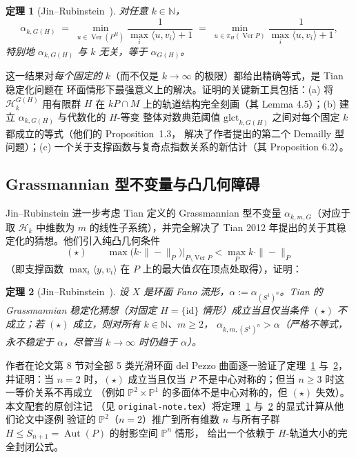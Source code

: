 \documentclass[11pt,a4paper]{article}
\newtheorem{theorem}{定理}[section]
\theoremstyle{definition}
\theoremstyle{remark}
\DeclareMathOperator{\Aut}{Aut}
\DeclareMathOperator{\Ver}{Ver}
\newcommand{\N}{\mathbb{N}}
\newcommand{\PP}{\mathbb{P}}
\begin{document}
\begin{theorem}[Jin--Rubinstein~{\cite[Theorem~1.4]{JR2025}}]\label{thm:JR14}
对任意 $k \in \N$，
\[
  \alpha_{k,G(H)} \;=\; \min_{u \in \Ver(P^H)} \frac{1}{\max_i \langle u, v_i\rangle + 1}
  \;=\; \min_{u \in \pi_H(\Ver P)} \frac{1}{\max_i \langle u, v_i\rangle + 1},
\]
特别地 $\alpha_{k,G(H)}$ 与 $k$ 无关，等于 $\alpha_{G(H)}$。
\end{theorem}

这一结果对\emph{每个固定的} $k$（而不仅是 $k\to\infty$ 的极限）都给出精确等式，是 Tian 稳定化问题在
环面情形下最强意义上的解决。证明的关键新工具包括：(a) 将 $\mathcal{H}_k^{G(H)}$ 用有限群 $H$ 在
$kP\cap M$ 上的轨道结构完全刻画（其 Lemma 4.5）；(b) 建立 $\alpha_{k,G(H)}$ 与代数化的 $H$-等变
整体对数典范阈值 $\mathrm{glct}_{k,G(H)}$ 之间对每个固定 $k$ 都成立的等式（他们的 Proposition~1.3，
解决了作者提出的第二个 Demailly 型问题）；(c) 一个关于支撑函数与复奇点指数关系的新估计（其
Proposition 6.2）。

\subsection{Grassmannian 型不变量与凸几何障碍}

Jin--Rubinstein 进一步考虑 Tian 定义的 Grassmannian 型不变量 $\alpha_{k,m,G}$（对应于取 $\mathcal{H}_k$
中维数为 $m$ 的线性子系统），并完全解决了 Tian 2012 年提出的关于其稳定化的猜想。他们引入纯凸几何条件
\[
  (\star)\qquad \max\big(k\cdot\|{-}\|_P\big)\big|_{P \setminus \Ver P} < \max_P k\cdot\|{-}\|_P
\]
（即支撑函数 $\max_i\langle y,v_i\rangle$ 在 $P$ 上的最大值\emph{仅}在顶点处取得），证明：

\begin{theorem}[Jin--Rubinstein~{\cite[Theorem~1.6]{JR2025}}]\label{thm:JR16}
设 $X$ 是环面 Fano 流形，$\alpha := \alpha_{(S^1)^n}$。Tian 的 Grassmannian 稳定化猜想（对固定 $H=\{\mathrm{id}\}$
情形）成立当且仅当条件 $(\star)$ \emph{不}成立；若 $(\star)$ 成立，则对所有 $k \in \N$、$m \ge 2$，
$\alpha_{k,m,(S^1)^n} > \alpha$（严格不等式，永不稳定于 $\alpha$，尽管当 $k\to\infty$ 时仍趋于 $\alpha$）。
\end{theorem}

作者在论文第 8 节对全部 5 类光滑环面 del Pezzo 曲面逐一验证了定理~\ref{thm:JR14} 与~\ref{thm:JR16}，
并证明：当 $n=2$ 时，$(\star)$ 成立当且仅当 $P$ 不是中心对称的；但当 $n \ge 3$ 时这一等价关系不再成立
（例如 $\PP^2 \times \PP^1$ 的多面体不是中心对称的，但 $(\star)$ 失效）。本文配套的原创注记
（见 \texttt{original-note.tex}）将定理~\ref{thm:JR14} 与~\ref{thm:JR16} 的显式计算从他们论文中逐例
验证的 $\PP^2$（$n=2$）推广到所有维数 $n$ 与所有子群 $H \le S_{n+1} = \Aut(P)$ 的射影空间 $\PP^n$ 情形，
给出一个依赖于 $H$-轨道大小的完全封闭公式。
\end{document}
